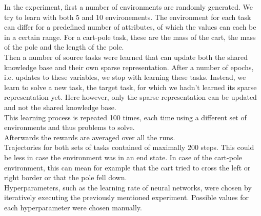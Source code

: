 \documentclass[a4paper, 11pt]{article}
\begin{document}
In the experiment, first a number of environments are randomly generated. We try to learn with both 5 and 10 environements.
The environment for each task can differ for a predefined number of attributes, of which the values can each be in a certain range. For a cart-pole task, these are the mass of the cart, the mass of the pole and the length of the pole.\\
Then a number of source tasks were learned that can update both the shared knowledge base and their own sparse representation. After a number of epochs, i.e. updates to these variables, we stop with learning these tasks. Instead, we learn to solve a new task, the target task, for which we hadn't learned its sparse representation yet. Here however, only the sparse representation can be updated and not the shared knowledge base.\\
This learning process is repeated 100 times, each time using a different set of environments and thus problems to solve.\\
Afterwards the rewards are averaged over all the runs.\\
Trajectories for both sets of tasks contained of maximally 200 steps. This could be less in case the environment was in an end state. In case of the cart-pole environment, this can mean for example that the cart tried to cross the left or right border or that the pole fell down.\\
Hyperparameters, such as the learning rate of neural networks, were chosen by iteratively executing the previously mentioned experiment. Possible values for each hyperparameter were chosen manually.
\end{document}
